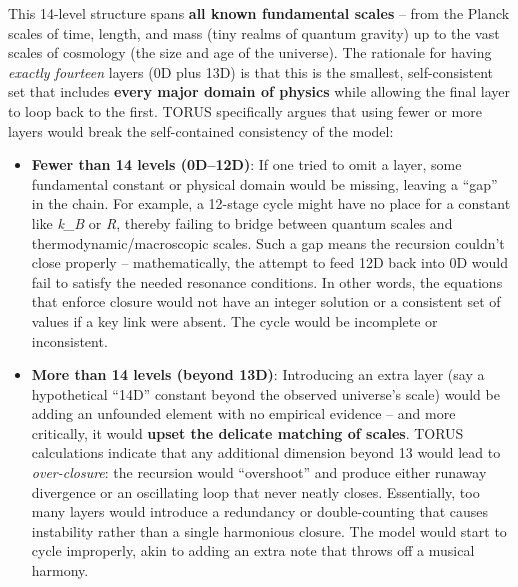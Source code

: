 \documentclass[
]{article}
\begin{document}
This 14-level structure spans \textbf{all known fundamental scales} --
from the Planck scales of time, length, and mass (tiny realms of quantum
gravity) up to the vast scales of cosmology (the size and age of the
universe)\hspace{0pt}. The rationale for having \emph{exactly fourteen}
layers (0D plus 13D) is that this is the smallest, self-consistent set
that includes \textbf{every major domain of physics} while allowing the
final layer to loop back to the first. TORUS specifically argues that
using fewer or more layers would break the self-contained consistency of
the model:

\begin{itemize}
\item
  \textbf{Fewer than 14 levels (0D--12D)}: If one tried to omit a layer,
  some fundamental constant or physical domain would be missing, leaving
  a ``gap'' in the chain. For example, a 12-stage cycle might have no
  place for a constant like
  \emph{k_{B}{}} or
  \emph{R}, thereby failing to bridge between quantum scales and
  thermodynamic/macroscopic scales\hspace{0pt}. Such a gap means the
  recursion couldn't close properly -- mathematically, the attempt to
  feed 12D back into 0D would fail to satisfy the needed resonance
  conditions. In other words, the equations that enforce closure would
  not have an integer solution or a consistent set of values if a key
  link were absent\hspace{0pt}. The cycle would be incomplete or
  inconsistent.
\item
  \textbf{More than 14 levels (beyond 13D)}: Introducing an extra layer
  (say a hypothetical ``14D'' constant beyond the observed universe's
  scale) would be adding an unfounded element with no empirical evidence
  -- and more critically, it would \textbf{upset the delicate matching
  of scales}. TORUS calculations indicate that any additional dimension
  beyond 13 would lead to \emph{over-closure}: the recursion would
  ``overshoot'' and produce either runaway divergence or an oscillating
  loop that never neatly closes\hspace{0pt}. Essentially, too many
  layers would introduce a redundancy or double-counting that causes
  instability rather than a single harmonious closure. The model would
  start to cycle improperly, akin to adding an extra note that throws
  off a musical harmony.
\end{itemize}
\end{document}
